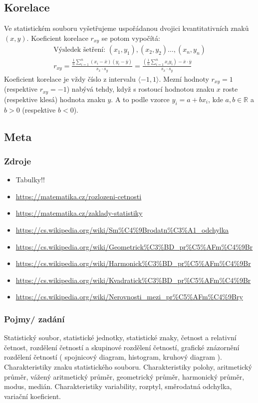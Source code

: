 \documentclass[12pt]{article}
\begin{document}
\subsection{Korelace}
Ve statistickém souboru vyšetřujeme uspořádanou dvojici kvantitativních znaků $(x,y)$. Koeficient korelace $r_{xy}$ se potom vypočítá:
\begin{align}
\text{Výsledek šetření: 	} (x_1,y_1),(x_2,y_2) \dotsc, (x_n, y_n)\\
r_{xy} = \frac{\frac{1}{n} \sum\limits^n_{i=1}\left(x_i - \overline{x}\right) \left(y_i - \overline{y}\right)}{s_x \cdot s_y} = \frac{\left( \frac{1}{n} \sum\limits^n_{i=1}x_i y_i \right)-\overline{x}\cdot\overline{y}}{s_x \cdot s_y}
\end{align}
Koeficient korelace je vždy číslo z intervalu $\langle -1, 1 \rangle$. Mezní hodnoty $r_{xy} = 1$ (respektive $r_{xy} = -1$) nabývá tehdy, když s rostoucí hodnotou znaku $x$ roste (respektive klesá) hodnota znaku $y$. A to podle vzorce $y_i = a + b x_i$, kde $a,b \in \mathbb{R}$ a $b >0$ (respektive $b<0$). 
\subsection{Meta}
\subsubsection{Zdroje}
\begin{itemize}
\item Tabulky!!
\item \url{https://matematika.cz/rozlozeni-cetnosti}
\item \url{https://matematika.cz/zaklady-statistiky}
\item \url{https://cs.wikipedia.org/wiki/Sm\%C4\%9Brodatn\%C3\%A1_odchylka}
\item \url{https://cs.wikipedia.org/wiki/Geometrick\%C3\%BD_pr\%C5\%AFm\%C4\%9Br}
\item \url{https://cs.wikipedia.org/wiki/Harmonick\%C3\%BD_pr\%C5\%AFm\%C4\%9Br}
\item \url{https://cs.wikipedia.org/wiki/Kvadratick\%C3\%BD_pr\%C5\%AFm\%C4\%9Br}
\item \url{https://cs.wikipedia.org/wiki/Nerovnosti_mezi_pr\%C5\%AFm\%C4\%9Bry}
\end{itemize}
\subsubsection{Pojmy/ zadání}
Statistický soubor, statistické jednotky, statistické znaky, četnost a relativní četnost, rozdělení četností a skupinové rozdělení četností, grafické znázornění rozdělení četností ( spojnicový diagram, histogram, kruhový diagram ). Charakteristiky znaku statistického souboru. Charakteristiky polohy, aritmetický průměr, vážený aritmetický průměr, geometrický průměr, harmonický průměr, modus, medián. Charakteristiky variability, rozptyl, směrodatná odchylka, variační koeficient.
\end{document}
